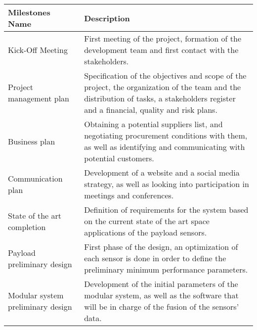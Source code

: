 \begin{longtable}[H]{>{\raggedright\arraybackslash}p{4cm} p{10cm}}
	
	\toprule[2pt]
	
	\textbf{Milestones Name} &  \textbf{Description} \\
	
	\midrule [1.5pt]
	\endhead
	
	Kick-Off Meeting & First meeting of the project, formation of the development team and first contact with the stakeholders.\vspace{0.2cm} \\
	
	\midrule
	
	Project management plan & Specification of the objectives and scope of the project, the organization of the team and the distribution of tasks, a stakeholders register and a financial, quality and risk plans.\vspace{0.2cm} \\
	
	\midrule
	
	Business plan & Obtaining a potential suppliers list, and negotiating procurement conditions with them, as well as identifying and communicating with potential customers.\vspace{0.2cm} \\
	
	\midrule
	
	Communication plan & Development of a website and a social media strategy, as well as looking into participation in meetings and conferences.\vspace{0.2cm} \\
	
	\midrule
	
	State of the art completion & Definition of requirements for the system based on the current state of the art space applications of the payload sensors.\vspace{0.2cm} \\
	
	\midrule  
	
	Payload preliminary design & First phase of the design, an optimization of each sensor is done in order to define the preliminary minimum performance parameters.\vspace{0.2cm} \\
	
	\midrule
	
	Modular system preliminary design & Development of the initial parameters of the modular system, as well as the software that will be in charge of the fusion of the sensors’ data.\vspace{0.2cm} \\
	

\end{longtable}
